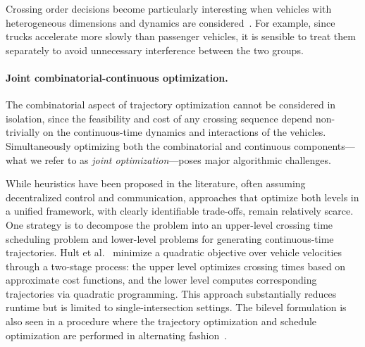 \documentclass{report}
\theoremstyle{definition}
\theoremstyle{plain}
\begin{document}
Crossing order decisions become particularly interesting when vehicles with
heterogeneous dimensions and dynamics are considered~\cite{joshiTrajectoriesPlatoonformingAlgorithm2025}. For example, since
trucks accelerate more slowly than passenger vehicles, it is sensible to treat
them separately to avoid unnecessary interference between the two groups.

\paragraph{Joint combinatorial-continuous optimization.}

The combinatorial aspect of trajectory optimization cannot be considered in
isolation, since the feasibility and cost of any crossing sequence depend
non-trivially on the continuous-time dynamics and interactions of the vehicles.
Simultaneously optimizing both the combinatorial and continuous
components---what we refer to as \emph{joint optimization}---poses major
algorithmic challenges.

While heuristics have been proposed in the literature,
often assuming decentralized control and communication, approaches that optimize
both levels in a unified framework, with clearly identifiable trade-offs, remain
relatively scarce.
%
One strategy is to decompose the problem into an upper-level crossing time
scheduling problem and lower-level problems for generating continuous-time
trajectories.
%
Hult et al.~\cite{hultApproximateSolutionOptimal2015} minimize a quadratic objective over vehicle velocities
through a two-stage process: the upper level optimizes crossing times based on
approximate cost functions, and the lower level computes corresponding
trajectories via quadratic programming. This approach substantially reduces
runtime but is limited to single-intersection settings. The bilevel formulation
is also seen in a procedure where the trajectory optimization and schedule
optimization are performed in alternating
fashion~\cite{zhaoBilevelProgrammingModel2021}.

\end{document}
